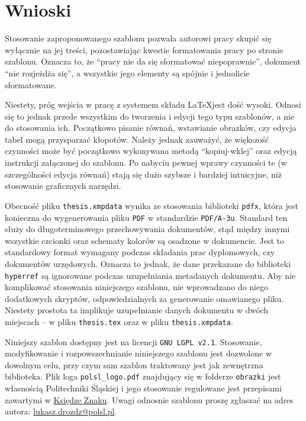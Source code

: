 \chapter{Wnioski}

Stosowanie zaproponowanego szablonu pozwala autorowi pracy skupić się wyłącznie na jej treści, pozostawiając kwestie formatowania pracy po stronie szablonu. Oznacza to, że \enquote{pracy nie da się sformatować niepoprawnie}, dokument \enquote{nie rozjeżdża się}, a wszystkie jego elementy są spójnie i jednolicie sformatowane.

Niestety, próg wejścia w pracę z systemem składu \LaTeX jest dość wysoki. Odnosi się to jednak przede wszystkim do tworzenia i edycji tego typu szablonów, a nie do stosowania ich. Początkowo pisanie równań, wstawianie obrazków, czy edycja tabel mogą przysparzać kłopotów. Należy jednak zauważyć, że większość czynności może być początkowo wykonywana metodą \enquote{kopiuj-wklej} oraz edycją instrukcji załączonej do szablonu. Po nabyciu pewnej wprawy czynności te (w szczególności edycja równań) stają się dużo szybsze i bardziej intuicyjne, niż stosowanie graficznych narzędzi.

Obecność pliku \verb|thesis.xmpdata| wynika ze stosowania biblioteki \verb|pdfx|, która jest konieczna do wygenerowania pliku \verb|PDF| w standardzie \verb|PDF/A-3u|. Standard ten służy do długoterminowego przechowywania dokumentów, stąd między innymi wszystkie czcionki oraz schematy kolorów są osadzone w dokumencie. Jest to standardowy format wymagany podczas składania prac dyplomowych, czy dokumentów urzędowych. Oznacza to jednak, że dane przekazane do biblioteki \verb|hyperref| są ignorowane podczas uzupełniania metadanych dokumentu. Aby nie komplikować stosowania niniejszego szablonu, nie wprowadzano do niego dodatkowych skryptów, odpowiedzialnych za generowanie omawianego pliku. Niestety prostota ta implikuje uzupełnianie danych dokumentu w dwóch miejscach -- w pliku \verb|thesis.tex| oraz w pliku \verb|thesis.xmpdata|.

Niniejszy szablon dostępny jest na licencji \verb|GNU LGPL v2.1|. Stosowanie, modyfikowanie i rozpowszechnianie niniejszego szablonu jest dozwolone w dowolnym celu, przy czym sam szablon traktowany jest jak zewnętrzna biblioteka. Plik loga \verb|polsl_logo.pdf| znajdujący się w folderze \verb|obrazki| jest własnością Politechniki Śląskiej i jego stosowanie regulowane jest przepisami zawartymi w \href{https://www.polsl.pl/siwps/logo-2/}{Księdze Znaku}. Uwagi odnosnie szablonu proszę zgłaszać na adres autora: \href{mailto:lukasz.drozdz@polsl.pl}{lukasz.drozdz@polsl.pl}.
